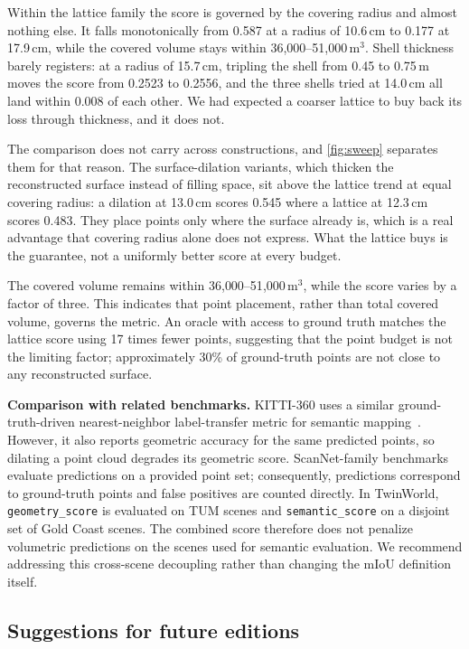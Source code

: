 \documentclass[10pt,twocolumn,letterpaper]{article}
\newcommand{\code}[1]{\texttt{\small #1}}
\begin{document}
Within the lattice family the score is governed by the covering radius and
almost nothing else. It falls monotonically from 0.587 at a radius of 10.6\,cm
to 0.177 at 17.9\,cm, while the covered volume stays within
36{,}000--51{,}000\,m$^3$. Shell thickness barely registers: at a radius of
15.7\,cm, tripling the shell from 0.45 to 0.75\,m moves the score from 0.2523 to
0.2556, and the three shells tried at 14.0\,cm all land within 0.008 of each
other. We had expected a coarser lattice to buy back its loss through thickness,
and it does not.

The comparison does not carry across constructions, and \cref{fig:sweep}
separates them for that reason. The surface-dilation variants, which thicken the
reconstructed surface instead of filling space, sit above the lattice trend at
equal covering radius: a dilation at 13.0\,cm scores 0.545 where a lattice at
12.3\,cm scores 0.483. They place points only where the surface already is,
which is a real advantage that covering radius alone does not express. What the
lattice buys is the guarantee, not a uniformly better score at every budget.

The covered volume remains within
36{,}000--51{,}000\,m$^3$, while the score varies by a factor of three. This
indicates that point placement, rather than total covered volume, governs the
metric. An oracle with access to ground truth matches the lattice score using 17
times fewer points, suggesting that the point budget is not the limiting factor;
approximately 30\% of ground-truth points are not close to any reconstructed
surface.

\textbf{Comparison with related benchmarks.} KITTI-360 uses a similar
ground-truth-driven nearest-neighbor label-transfer metric for semantic
mapping~\cite{liao2022kitti360}. However, it also reports geometric accuracy for
the same predicted points, so dilating a point cloud degrades its geometric
score. ScanNet-family benchmarks evaluate predictions on a provided point set;
consequently, predictions correspond to ground-truth points and false positives
are counted directly. In TwinWorld, \code{geometry\_score} is evaluated on TUM
scenes and \code{semantic\_score} on a disjoint set of Gold Coast scenes. The
combined score therefore does not penalize volumetric predictions on the scenes
used for semantic evaluation. We recommend addressing this cross-scene
decoupling rather than changing the mIoU definition itself.

\subsection{Suggestions for future editions}
\end{document}
